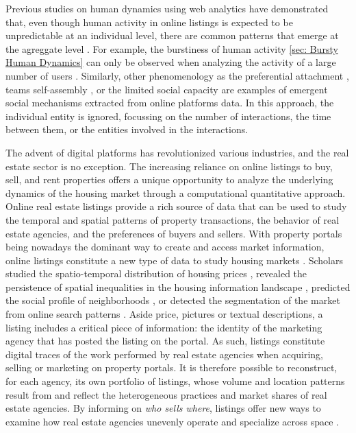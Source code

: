 Previous studies on human dynamics using web analytics have demonstrated that, even though human activity in online listings is expected to be unpredictable at an individual level, there are common patterns that emerge at the agreggate level \cite{Lazer2009CompSocSci}. For example, the burstiness of human activity \ref{sec: Bursty Human Dynamics} can only be observed when analyzing the activity of a large number of users \cite{karsai-2011}. Similarly, other phenomenology as the preferential attachment \cite{barabasi1999emergence,goncalves-2008}, teams self-assembly \cite{guimera-2005}, or the limited social capacity \cite{goncalves-2011,dunbar-2012} are examples of emergent social mechanisms extracted from online platforms data. In this approach, the individual entity is ignored, focussing on the number of interactions, the time between them, or the entities involved in the interactions.

The advent of digital platforms has revolutionized various industries, and the real estate sector is no exception. The increasing reliance on online listings to buy, sell, and rent properties offers a unique opportunity to analyze the underlying dynamics of the housing market through a computational quantitative approach. Online real estate listings provide a rich source of data that can be used to study the temporal and spatial patterns of property transactions, the behavior of real estate agencies, and the preferences of buyers and sellers. With property portals being nowadays the dominant way to create and access market information, online listings constitute a new type of data to study housing markets \cite{sawyer1999ict, boeing2017new, boulay2021moving}. Scholars studied the spatio-temporal distribution of housing prices \cite{yao2018mapping,adolfsen_segmentation_2022}, revealed the persistence of spatial inequalities in the housing information landscape \cite{boeing2020online}, predicted the social profile of neighborhoods \cite{delmelle2021language}, or detected the segmentation of the market from online search patterns \cite{rae2015online}.
Aside price, pictures or textual descriptions, a listing includes a critical piece of information: the identity of the marketing agency that has posted the listing on the portal. As such, listings constitute digital traces \cite{salganikbit2017} of the work performed by real estate agencies when acquiring, selling or marketing on property portals. It is therefore possible to reconstruct, for each agency, its own portfolio of listings, whose volume and location patterns result from and reflect the heterogeneous practices and market shares of real estate agencies. By informing on \textit{who sells where}, listings offer new ways to examine how real estate agencies unevenly operate and specialize across space \cite{palm1976RealEstate}.

